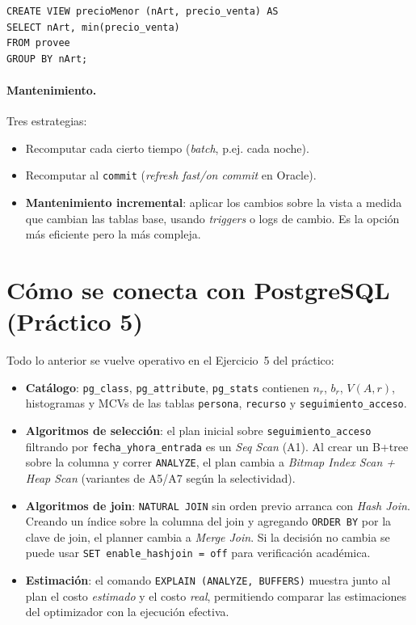 \documentclass[11pt,a4paper]{article}
\begin{document}
\begin{lstlisting}
CREATE VIEW precioMenor (nArt, precio_venta) AS
SELECT nArt, min(precio_venta)
FROM provee
GROUP BY nArt;
\end{lstlisting}

\paragraph{Mantenimiento.} Tres estrategias:
\begin{itemize}
    \item Recomputar cada cierto tiempo (\emph{batch}, p.ej. cada noche).
    \item Recomputar al \texttt{commit} (\emph{refresh fast/on commit} en
    Oracle).
    \item \textbf{Mantenimiento incremental}: aplicar los cambios sobre la
    vista a medida que cambian las tablas base, usando \emph{triggers} o
    logs de cambio. Es la opción más eficiente pero la más compleja.
\end{itemize}

\section{Cómo se conecta con PostgreSQL (Práctico 5)}

Todo lo anterior se vuelve operativo en el Ejercicio~5 del práctico:

\begin{itemize}
    \item \textbf{Catálogo}: \texttt{pg\_class}, \texttt{pg\_attribute},
    \texttt{pg\_stats} contienen $n_r$, $b_r$, $V(A,r)$, histogramas y MCVs
    de las tablas \texttt{persona}, \texttt{recurso} y
    \texttt{seguimiento\_acceso}.
    \item \textbf{Algoritmos de selección}: el plan inicial sobre
    \texttt{seguimiento\_acceso} filtrando por \texttt{fecha\_yhora\_entrada}
    es un \emph{Seq Scan} (A1). Al crear un B+tree sobre la columna y correr
    \texttt{ANALYZE}, el plan cambia a \emph{Bitmap Index Scan + Heap Scan}
    (variantes de A5/A7 según la selectividad).
    \item \textbf{Algoritmos de join}: \texttt{NATURAL JOIN} sin orden
    previo arranca con \emph{Hash Join}. Creando un índice sobre la columna
    del join y agregando \texttt{ORDER BY} por la clave de join, el planner
    cambia a \emph{Merge Join}. Si la decisión no cambia se puede usar
    \texttt{SET enable\_hashjoin = off} para verificación académica.
    \item \textbf{Estimación}: el comando \texttt{EXPLAIN (ANALYZE, BUFFERS)}
    muestra junto al plan el costo \emph{estimado} y el costo \emph{real},
    permitiendo comparar las estimaciones del optimizador con la ejecución
    efectiva.
\end{itemize}
\end{document}
